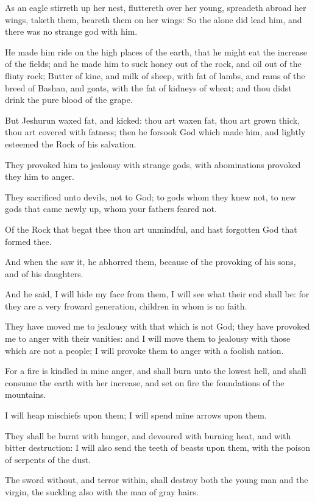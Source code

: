 \verse As an eagle stirreth up her nest, fluttereth over her young, spreadeth abroad her wings, taketh them, beareth them on her wings: \verse So the \LORD alone did lead him, and there was no strange god with him.

\verse He made him ride on the high places of the earth, that he might eat the increase of the fields; and he made him to suck honey out of the rock, and oil out of the flinty rock; \verse Butter of kine, and milk of sheep, with fat of lambs, and rams of the breed of Bashan, and goats, with the fat of kidneys of wheat; and thou didst drink the pure blood of the grape.

\verse But Jeshurun waxed fat, and kicked: thou art waxen fat, thou art grown thick, thou art covered with fatness; then he forsook God which made him, and lightly esteemed the Rock of his salvation.

\verse They provoked him to jealousy with strange gods, with abominations provoked they him to anger.

\verse They sacrificed unto devils, not to God; to gods whom they knew not, to new gods that came newly up, whom your fathers feared not.

\verse Of the Rock that begat thee thou art unmindful, and hast forgotten God that formed thee.

\verse And when the \LORD saw it, he abhorred them, because of the provoking of his sons, and of his daughters.

\verse And he said, I will hide my face from them, I will see what their end shall be: for they are a very froward generation, children in whom is no faith.

\verse They have moved me to jealousy with that which is not God; they have provoked me to anger with their vanities: and I will move them to jealousy with those which are not a people; I will provoke them to anger with a foolish nation.

\verse For a fire is kindled in mine anger, and shall burn unto the lowest hell, and shall consume the earth with her increase, and set on fire the foundations of the mountains.

\verse I will heap mischiefs upon them; I will spend mine arrows upon them.

\verse They shall be burnt with hunger, and devoured with burning heat, and with bitter destruction: I will also send the teeth of beasts upon them, with the poison of serpents of the dust.

\verse The sword without, and terror within, shall destroy both the young man and the virgin, the suckling also with the man of gray hairs.

